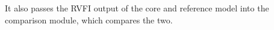 It also passes the RVFI output of the core and reference model into the comparison module, which compares the two.



%
%
%
%
%
%
%
%
%


